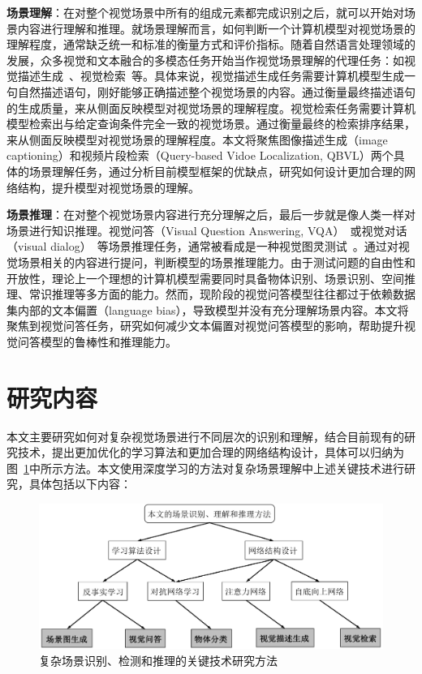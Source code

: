 \begin{asparaenum}
\item \textbf{场景理解}：在对整个视觉场景中所有的组成元素都完成识别之后，就可以开始对场景内容进行理解和推理。就场景理解而言，如何判断一个计算机模型对视觉场景的理解程度，通常缺乏统一和标准的衡量方式和评价指标。随着自然语言处理领域的发展，众多视觉和文本融合的多模态任务开始当作视觉场景理解的代理任务：如视觉描述生成~\cite{vinyals2015show}、视觉检索~\cite{gao2017tall}等。具体来说，视觉描述生成任务需要计算机模型生成一句自然描述语句，刚好能够正确描述整个视觉场景的内容。通过衡量最终描述语句的生成质量，来从侧面反映模型对视觉场景的理解程度。视觉检索任务需要计算机模型检索出与给定查询条件完全一致的视觉场景。通过衡量最终的检索排序结果，来从侧面反映模型对视觉场景的理解程度。本文将聚焦图像描述生成（image captioning）和视频片段检索（Query-based Vidoe Localization, QBVL）两个具体的场景理解任务，通过分析目前模型框架的优缺点，研究如何设计更加合理的网络结构，提升模型对视觉场景的理解。

\item \textbf{场景推理}：在对整个视觉场景内容进行充分理解之后，最后一步就是像人类一样对场景进行知识推理。视觉问答（Visual Question Answering, VQA）~\cite{antol2015vqa}或视觉对话（visual dialog）~\cite{das2017visual}等场景推理任务，通常被看成是一种视觉图灵测试~\cite{malinowski2014towards,geman2015visual}。通过对视觉场景相关的内容进行提问，判断模型的场景推理能力。由于测试问题的自由性和开放性，理论上一个理想的计算机模型需要同时具备物体识别、场景识别、空间推理、常识推理等多方面的能力。然而，现阶段的视觉问答模型往往都过于依赖数据集内部的文本偏置（language bias），导致模型并没有充分理解场景内容。本文将聚焦到视觉问答任务，研究如何减少文本偏置对视觉问答模型的影响，帮助提升视觉问答模型的鲁棒性和推理能力。
\end{asparaenum}


\section{研究内容}

本文主要研究如何对复杂视觉场景进行不同层次的识别和理解，结合目前现有的研究技术，提出更加优化的学习算法和更加合理的网络结构设计，具体可以归纳为图~\ref{ch1:fig:technique_summary}中所示方法。本文使用深度学习的方法对复杂场景理解中上述关键技术进行研究，具体包括以下内容：

\begin{figure}[t]
    \centering
        \includegraphics[width=0.95\linewidth]{chapter1/res/technique_summary.pdf}
    \centering
    \caption{复杂场景识别、检测和推理的关键技术研究方法}
    \label{ch1:fig:technique_summary}
\end{figure}

